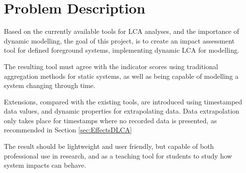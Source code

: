 \section{Problem Description}\label{sec:ProjectDescription}

Based on the currently available tools for LCA analyses, and the importance of dynamic modelling, the goal of this project, is to create an impact assessment tool for defined foreground systems, implementing dynamic LCA for modelling.

The resulting tool must agree with the indicator scores using traditional aggregation methods for static systems, as well as being capable of modelling a system changing through time.

Extensions, compared with the existing tools, are introduced using timestamped data values, and dynamic properties for extrapolating data. Data extrapolation only takes place for timestamps where no recorded data is presented, as recommended in Section \ref{sec:EffectsDLCA}

The result should be lightweight and user friendly, but capable of both professional use in research, and as a teaching tool for students to study how system impacts can behave.